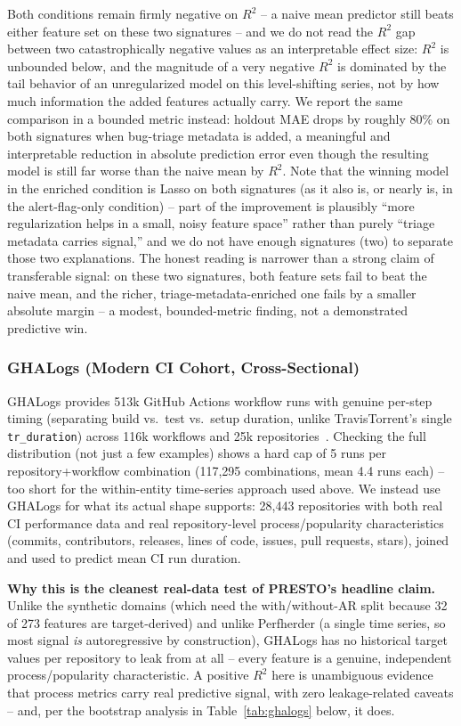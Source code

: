\documentclass[technologies,article,submit,pdftex,moreauthors]{Definitions/mdpi}
\begin{document}
Both conditions remain firmly negative on $R^2$ -- a naive mean predictor still
beats either feature set on these two signatures -- and we do not read
the $R^2$ gap between two catastrophically negative values as an
interpretable effect size: $R^2$ is unbounded below, and the magnitude
of a very negative $R^2$ is dominated by the tail behavior of an
unregularized model on this level-shifting series, not by how much
information the added features actually carry. We report the same
comparison in a bounded metric instead: holdout MAE drops by roughly
80\% on both signatures when bug-triage metadata is added, a meaningful
and interpretable reduction in absolute prediction error even though the
resulting model is still far worse than the naive mean by $R^2$. Note
that the winning model in the enriched condition is Lasso on both
signatures (as it also is, or nearly is, in the alert-flag-only
condition) -- part of the improvement is plausibly ``more regularization
helps in a small, noisy feature space'' rather than purely ``triage
metadata carries signal,'' and we do not have enough signatures (two) to
separate those two explanations. The honest reading is narrower than a
strong claim of transferable signal: on these two signatures, both
feature sets fail to beat the naive mean, and the richer,
triage-metadata-enriched one fails by a smaller absolute margin -- a
modest, bounded-metric finding, not a demonstrated predictive win.

\subsubsection{GHALogs (Modern CI Cohort,
Cross-Sectional)}\label{sec:ghalogs}

GHALogs provides 513k GitHub Actions workflow runs with genuine per-step
timing (separating build vs.~test vs.~setup duration, unlike
TravisTorrent's single \texttt{tr\_duration}) across 116k workflows and
25k repositories~\cite{ghalogs2024}. Checking the full distribution (not just a few
examples) shows a hard cap of 5 runs per repository+workflow combination
(117,295 combinations, mean 4.4 runs each) -- too short for the
within-entity time-series approach used above. We instead use GHALogs
for what its actual shape supports: 28,443 repositories with both real
CI performance data and real repository-level process/popularity
characteristics (commits, contributors, releases, lines of code, issues,
pull requests, stars), joined and used to predict mean CI run duration.

\textbf{Why this is the cleanest real-data test of PRESTO's headline
claim.} Unlike the synthetic domains (which need the with/without-AR
split because 32 of 273 features are target-derived) and unlike
Perfherder (a single time series, so most signal \emph{is}
autoregressive by construction), GHALogs has no historical target values
per repository to leak from at all -- every feature is a genuine,
independent process/popularity characteristic. A positive \(R^2\) here
is unambiguous evidence that process metrics carry real predictive
signal, with zero leakage-related caveats -- and, per the bootstrap
analysis in Table~\ref{tab:ghalogs} below, it does.
\end{document}

